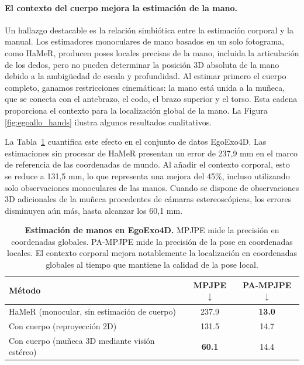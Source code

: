 \documentclass[../../book-main_es.tex]{subfiles}
\begin{document}
\paragraph{El contexto del cuerpo mejora la estimación de la mano.}
Un hallazgo destacable es la relación simbiótica entre la estimación corporal y la manual.
Los estimadores monoculares de mano basados en un solo fotograma, como HaMeR, producen
poses locales precisas de la mano, incluida la articulación de los dedos, pero no pueden
determinar la posición 3D absoluta de la mano debido a la ambigüedad de escala y profundidad. 
Al estimar primero el cuerpo completo, ganamos restricciones cinemáticas:
la mano está unida a la muñeca, que se conecta con el
antebrazo, el codo, el brazo superior y el torso. Esta cadena proporciona el contexto para
la localización global de la mano. La Figura \ref{fig:egoallo_hands} ilustra algunos
resultados cualitativos.

La Tabla~\ref{tab:egoallo_hands} cuantifica este efecto en el conjunto de datos EgoExo4D. Las estimaciones sin procesar
de HaMeR presentan un error de 237,9 mm en el marco de referencia de las coordenadas de mundo. Al añadir el contexto corporal,
esto se reduce a 131,5 mm, lo que representa una mejora del 45\%, incluso utilizando solo
observaciones monoculares de las manos. Cuando se dispone de observaciones 3D adicionales de la muñeca
procedentes de cámaras estereoscópicas, los errores disminuyen aún más, hasta alcanzar los 60,1 mm.

\begin{table}[t]
    \centering
    \caption{\textbf{Estimación de manos en EgoExo4D.} MPJPE mide
        la precisión en coordenadas globales. PA-MPJPE mide la precisión de la pose en coordenadas locales. El contexto corporal
        mejora notablemente la localización en coordenadas globales al tiempo que
    mantiene la calidad de la pose local.}
    \label{tab:egoallo_hands}
    \small
    \begin{tabular}{lcc}
        \toprule
        \textbf{Método} & \textbf{MPJPE}$\downarrow$ &
        \textbf{PA-MPJPE}$\downarrow$ \\
        \midrule
        HaMeR (monocular, sin estimación de cuerpo) & 237.9 & \textbf{13.0} \\
        \midrule
        Con cuerpo (reproyección 2D) & 131.5 & 14.7 \\
        Con cuerpo (muñeca 3D mediante visión estéreo) & \textbf{60.1} & 14.4 \\
        \bottomrule
    \end{tabular}
\end{table}
\end{document}
